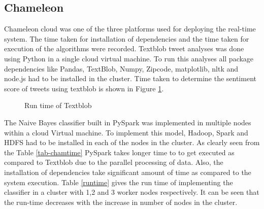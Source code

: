 \documentclass[9pt,twocolumn,twoside]{../../styles/osajnl}
\begin{document}
\subsection{Chameleon}
Chameleon cloud was one of the three platforms used for deploying the real-time system. The time taken for installation of dependencies and the time taken for execution of the algorithms were recorded. Textblob tweet analyses was done using Python in a single cloud virtual machine. To run this analyses all package dependencies like Pandas, TextBlob, Numpy, Zipcode, matplotlib, nltk and node.js had to be installed in the cluster. Time taken to determine the sentiment score of tweets using textblob is shown in Figure \ref{fig:tbrun}.\\
\begin{figure}[htbp]
\centering
{}
\caption{Run time of Textblob}
\label{fig:tbrun}
\end{figure}
The Naive Bayes classifier built in PySpark was implemented in multiple nodes within a cloud Virtual machine. To implement this model, Hadoop, Spark and HDFS had to be installed in each of the nodes in the cluster. As clearly seen from the Table \ref{tab-chamtime} PySpark takes longer time to to get executed as compared to Textblob due to the parallel processing of data. Also, the installation of dependencies take significant amount of time as compared to the system execution. Table \ref{runtime} gives the run time of implementing the classifier in a cluster with 1,2 and 3 worker nodes respectively. It can be seen that the run-time decreases with the increase in number of nodes in the cluster. 
\end{document}
